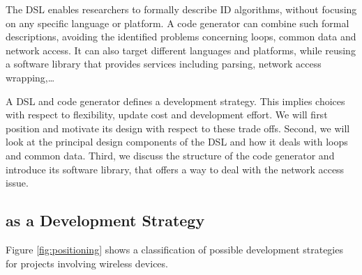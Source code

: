 \documentclass[conference]{IEEEtran}
\begin{document}
The DSL enables researchers to formally describe ID algorithms, without
focusing on any specific language or platform. A code generator can combine
such formal descriptions, avoiding the identified problems concerning loops,
common data and network access. It can also target different languages and
platforms, while reusing a software library that provides services including
parsing, network access wrapping,\dots

A DSL and code generator defines a development strategy. This implies choices
with respect to flexibility, update cost and development effort. We will first
position \NAME and motivate its design with respect to these trade offs.
Second, we will look at the principal design components of the DSL and how it
deals with loops and common data. Third, we discuss the structure of the code
generator and introduce its software library, that offers a way to deal with
the network access issue.

\subsection{\NAME as a Development Strategy}
\label{positioning}

Figure \ref{fig:positioning} shows a classification of possible development
strategies for projects involving wireless devices.

\newcommand{\ball}[5][above,yshift=+5pt]{
\tdplottransformmainscreen{#2}{#3}{#4}
\shadedraw[tdplot_screen_coords, ball color=lightgray,draw=lightgray,shading angle=-90]
  (\tdplotresx,\tdplotresy) circle (0.20)
  node[text=gray,font=\footnotesize,#1]{#5};
}
\end{document}
